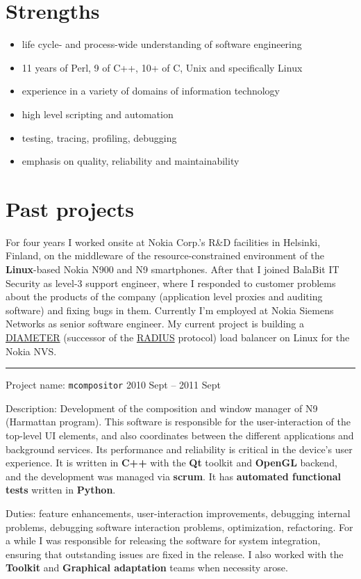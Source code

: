 \documentclass[a4paper,12pt]{article}
\newcommand\Yell{\textbf}
\newcommand\Label{\textsf}
\newcommand{\compress}{\setlength\itemsep{-\parskip}}
\newcommand{\midline}{\rule[0.5ex]{\linewidth-\parindent}{.5pt}}
\begin{document}
\section{Strengths}

\begin{itemize}\compress
\item	life cycle- and process-wide understanding of software engineering
\item	11 years of Perl, 9 of C++, 10+ of C, Unix and specifically Linux
\item	experience in a variety of domains of information technology
\item	high level scripting and automation
\item	testing, tracing, profiling, debugging
\item	emphasis on quality, reliability and maintainability
\end{itemize}

\section{Past projects}

For four years I worked onsite at Nokia Corp.'s R\&D facilities in Helsinki,
Finland, on the middleware of the resource-constrained environment of the
\Yell{Linux}-based Nokia N900 and N9 smartphones.  After that I joined
BalaBit IT Security as level-3 support engineer, where I responded to
customer problems about the products of the company (application level
proxies and auditing software) and fixing bugs in them.  Currently I'm
employed at Nokia Siemens Networks as senior software engineer.  My
current project is building a \href{http://tools.ietf.org/html/rfc6733}%
{DIAMETER} (successor of the \href{http://tools.ietf.org/html/rfc2865}%
{RADIUS} protocol) load balancer on Linux for the Nokia NVS.

\midline\par
\Label{Project name}: \texttt{mcompositor}\hfill
\Label{2010 Sept -- 2011 Sept}\par
\Label{Description}: Development of the composition and window manager of N9
(Harmattan program).  This software is responsible for the user-interaction
of the top-level UI elements, and also coordinates between the different
applications and background services.  Its performance and reliability is
critical in the device's user experience.  It is written in \Yell{C++} with
the \Yell{Qt} toolkit and \Yell{OpenGL} backend, and the development was
managed via \Yell{scrum}.  It has \Yell{automated functional tests} written in
\Yell{Python}.\par
\Label{Duties}: feature enhancements, user-interaction improvements,
debugging internal problems, debugging software interaction problems,
optimization, refactoring.  For a while I was responsible for releasing
the software for system integration, ensuring that outstanding issues
are fixed in the release.  I also worked with the \Yell{Toolkit} and
\Yell{Graphical adaptation} teams when necessity arose.
\end{document}
